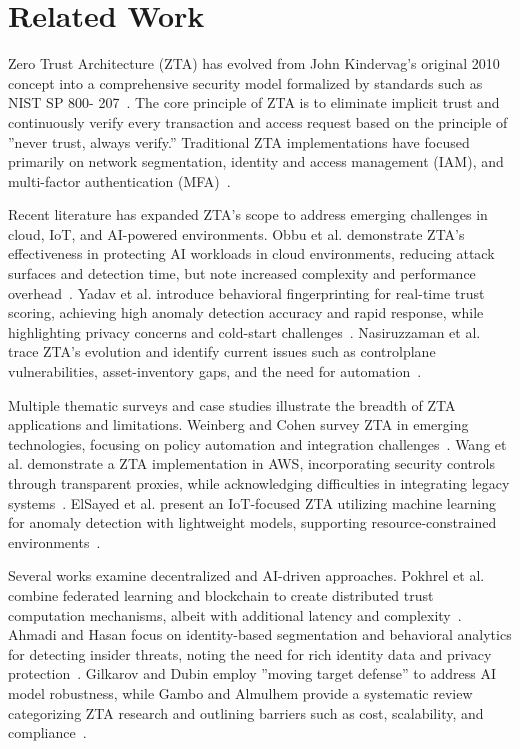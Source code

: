 \documentclass[conference]{IEEEtran}
\begin{document}
\section{Related Work}
Zero Trust Architecture (ZTA) has evolved from John
Kindervag’s original 2010 concept into a comprehensive
security model formalized by standards such as NIST SP 800-
207~\cite{nist800207}. The core principle of ZTA is to eliminate implicit
trust and continuously verify every transaction and access
request based on the principle of ”never trust, always verify.”
Traditional ZTA implementations have focused primarily on
network segmentation, identity and access management (IAM),
and multi-factor authentication (MFA)~\cite{rose2020zero}.

Recent literature has expanded ZTA’s scope to address emerging challenges in cloud, IoT, and AI-powered environments.
Obbu et al. demonstrate ZTA’s effectiveness in protecting AI
workloads in cloud environments, reducing attack surfaces and
detection time, but note increased complexity and performance
overhead~\cite{obbu2023cloud}. Yadav et al. introduce behavioral fingerprinting
for real-time trust scoring, achieving high anomaly detection
accuracy and rapid response, while highlighting privacy concerns and cold-start challenges~\cite{yadav2023behavioral}. Nasiruzzaman et al. trace
ZTA’s evolution and identify current issues such as controlplane vulnerabilities, asset-inventory gaps, and the need for
automation~\cite{nasiruzzaman2023evolution}.

Multiple thematic surveys and case studies illustrate the
breadth of ZTA applications and limitations. Weinberg and
Cohen survey ZTA in emerging technologies, focusing on
policy automation and integration challenges~\cite{weinberg2023survey}. Wang et al.
demonstrate a ZTA implementation in AWS, incorporating
security controls through transparent proxies, while acknowledging difficulties in integrating legacy systems~\cite{wang2023aws}. ElSayed
et al. present an IoT-focused ZTA utilizing machine learning
for anomaly detection with lightweight models, supporting
resource-constrained environments~\cite{elsayed2023iot}.

Several works examine decentralized and AI-driven approaches. Pokhrel et al. combine federated learning and
blockchain to create distributed trust computation mechanisms,
albeit with additional latency and complexity~\cite{pokhrel2023federated}. Ahmadi and
Hasan focus on identity-based segmentation and behavioral
analytics for detecting insider threats, noting the need for rich
identity data and privacy protection~\cite{ahmadi2023identity, hasan2023insider}. Gilkarov and
Dubin employ ”moving target defense” to address AI model
robustness, while Gambo and Almulhem provide a systematic
review categorizing ZTA research and outlining barriers such
as cost, scalability, and compliance~\cite{gilkarov2023moving, gambo2023systematic}.
\end{document}
